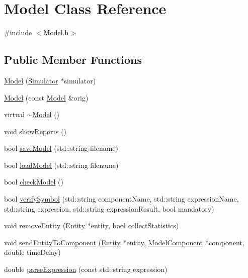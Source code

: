 \hypertarget{class_model}{\section{Model Class Reference}
\label{class_model}
}


{\ttfamily \#include $<$Model.\-h$>$}

\subsection*{Public Member Functions}
\begin{DoxyCompactItemize}
\item 
\hyperlink{class_model_ae86e1403523e8036ba6366d1967ecac0}{Model} (\hyperlink{class_simulator}{Simulator} $\ast$simulator)
\item 
\hyperlink{class_model_afdedf278781f785abeecf5f450e43653}{Model} (const \hyperlink{class_model}{Model} \&orig)
\item 
virtual \hyperlink{class_model_ad6ebd2062a0b823db841a0b88baac4c0}{$\sim$\-Model} ()
\item 
void \hyperlink{class_model_a44c66f552308e7a6a5701801186a8637}{show\-Reports} ()
\item 
bool \hyperlink{class_model_ae099910781f5267a51fb5d607246af4a}{save\-Model} (std\-::string filename)
\item 
bool \hyperlink{class_model_aba57e8b62d4dcc3ac8e3037933fa6f04}{load\-Model} (std\-::string filename)
\item 
bool \hyperlink{class_model_ae3b293adffbef6fd254d661ceeb2e116}{check\-Model} ()
\item 
bool \hyperlink{class_model_ae2be8579f8519eec5da9e6f72c7ec361}{verify\-Symbol} (std\-::string component\-Name, std\-::string expression\-Name, std\-::string expression, std\-::string expression\-Result, bool mandatory)
\item 
void \hyperlink{class_model_ae62bb3a21cd56fbf9d34195edf2fb9e0}{remove\-Entity} (\hyperlink{class_entity}{Entity} $\ast$entity, bool collect\-Statistics)
\item 
void \hyperlink{class_model_a244dff6d6bef962b0d95fbe712954079}{send\-Entity\-To\-Component} (\hyperlink{class_entity}{Entity} $\ast$entity, \hyperlink{class_model_component}{Model\-Component} $\ast$component, double time\-Delay)
\item 
double \hyperlink{class_model_a5ea283e339b50c0b77040bf908e25af3}{parse\-Expression} (const std\-::string expression)
\item 

\end{DoxyCompactItemize}
